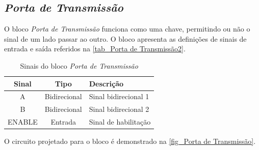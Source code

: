 \renewcommand{\NomeBloco}{\emph{Porta de Transmissão}}
\renewcommand{\NomeBlocoNoIt}{Porta de Transmissão}
\renewcommand{\NomePTab}{tab_\NomeBlocoNoIt}
\renewcommand{\NomeSTab}{tab_\NomeBlocoNoIt2}
\renewcommand{\NomePFig}{fig_\NomeBlocoNoIt}
\renewcommand{\NomeSFig}{fig_\NomeBlocoNoIt2}
\renewcommand{\NomeTTab}{tab_\NomeBlocoNoIt3}

\subsection{\NomeBloco}

O bloco \emph{\NomeBloco{}} funciona como uma chave, permitindo ou n\~ao o sinal de um lado passar ao outro. O bloco apresenta as defini{\c c}\~oes de sinais de entrada e sa\'ida referidos na \autoref{\NomeSTab}.

\begin{table}[htbp]
\caption{Sinais do bloco \emph{\NomeBloco}}
\label{\NomeSTab}
\centering
\begin{tabular}{ccl}

    \toprule
    Sinal & Tipo    & Descri{\c c}\~ao        \\
    \midrule \midrule
    A & Bidirecional & Sinal bidirecional 1\\
    \midrule
    B & Bidirecional & Sinal bidirecional 2\\
    \midrule
    ENABLE & Entrada & Sinal de habilita{\c c}\~ao\\
    \bottomrule
\end{tabular}
\end{table}

O circuito projetado para o bloco \'e demonstrado na \autoref{\NomePFig}.

